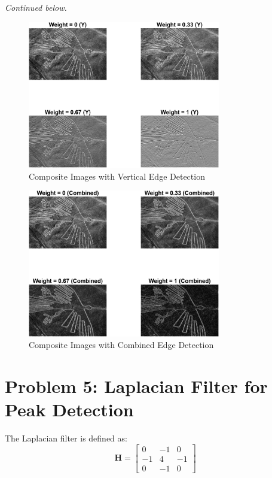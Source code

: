 \documentclass[12pt]{article}
\begin{document}
\vspace{1cm}
\begin{center}
    \textit{Continued below.}
\end{center}

\begin{figure}[H]
    \centering
    \includegraphics[width=0.75\textwidth]{vertical_edge_composites.png}
    \caption{Composite Images with Vertical Edge Detection}
\end{figure}

\begin{figure}[H]
    \centering
    \includegraphics[width=0.75\textwidth]{combined_edge_composites.png}
    \caption{Composite Images with Combined Edge Detection}
\end{figure}


\newpage
\section*{Problem 5: Laplacian Filter for Peak Detection}
The Laplacian filter is defined as:
\[
\bm{H} = \begin{bmatrix}
0 & -1 & 0 \\
-1 & 4 & -1 \\
0 & -1 & 0
\end{bmatrix}
\]
\end{document}
